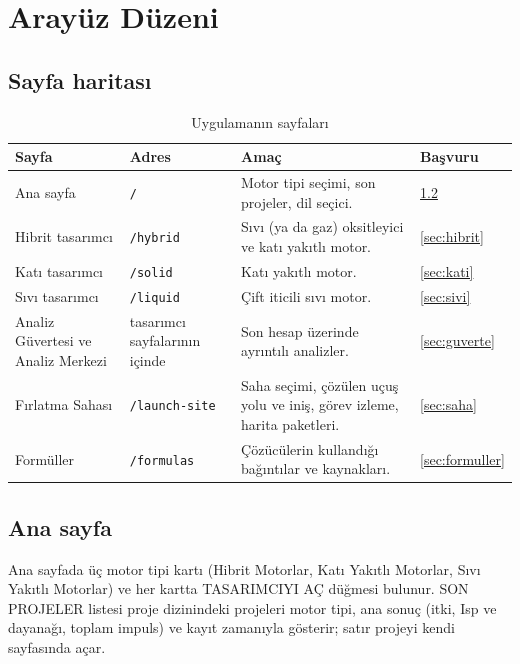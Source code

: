 \documentclass[11pt,a4paper]{article}
\newcommand{\ui}[1]{\textsf{#1}}
\newcommand{\kod}[1]{\texttt{#1}}
\begin{document}
\section{Arayüz Düzeni}\label{sec:arayuz}

\subsection{Sayfa haritası}

\begin{table}[htbp]
\centering\small
\caption{Uygulamanın sayfaları}\label{tab:sayfalar}
\begin{tabular}{@{}>{\raggedright\arraybackslash}p{3.4cm}>{\raggedright\arraybackslash}p{2.4cm}>{\raggedright\arraybackslash}p{7.2cm}>{\raggedright\arraybackslash}p{2.6cm}@{}}
\toprule
\textbf{Sayfa} & \textbf{Adres} & \textbf{Amaç} & \textbf{Başvuru} \\
\midrule
Ana sayfa & \kod{/\allowbreak{}} & Motor tipi seçimi, son projeler, dil seçici. & \ref{sec:anasayfa} \\
Hibrit tasarımcı & \kod{/\allowbreak{}hybrid} & Sıvı (ya da gaz) oksitleyici ve katı yakıtlı motor. & \ref{sec:hibrit} \\
Katı tasarımcı & \kod{/\allowbreak{}solid} & Katı yakıtlı motor. & \ref{sec:kati} \\
Sıvı tasarımcı & \kod{/\allowbreak{}liquid} & Çift iticili sıvı motor. & \ref{sec:sivi} \\
Analiz Güvertesi ve Analiz Merkezi & tasarımcı sayfalarının içinde & Son hesap üzerinde ayrıntılı analizler. & \ref{sec:guverte} \\
Fırlatma Sahası & \kod{/\allowbreak{}launch-site} & Saha seçimi, çözülen uçuş yolu ve iniş, görev izleme, harita paketleri. & \ref{sec:saha} \\
Formüller & \kod{/\allowbreak{}formulas} & Çözücülerin kullandığı bağıntılar ve kaynakları. & \ref{sec:formuller} \\
\bottomrule
\end{tabular}
\end{table}

\subsection{Ana sayfa}\label{sec:anasayfa}

Ana sayfada üç motor tipi kartı (\ui{Hibrit Motorlar}, \ui{Katı Yakıtlı
Motorlar}, \ui{Sıvı Yakıtlı Motorlar}) ve her kartta \ui{TASARIMCIYI AÇ}
düğmesi bulunur. \ui{SON PROJELER} listesi proje dizinindeki projeleri motor
tipi, ana sonuç (itki, Isp ve dayanağı, toplam impuls) ve kayıt zamanıyla
gösterir; satır projeyi kendi sayfasında açar.
\end{document}
